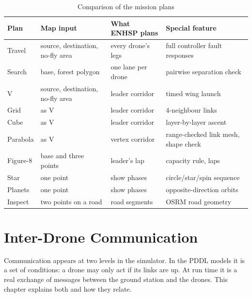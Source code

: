 \documentclass[11pt,a4paper,oneside]{report}
\begin{document}
\begin{table}[!htb]
\caption{Comparison of the mission plans}\label{tab:plansummary}
\small
\begin{tabularx}{\textwidth}{@{}lP{0.2\textwidth}P{0.22\textwidth}Y@{}}
\toprule
\textbf{Plan} & \textbf{Map input} & \textbf{What ENHSP plans} & \textbf{Special feature} \\
\midrule
Travel     & source, destination, no-fly area & every drone's legs & full controller fault responses \\
Search     & base, forest polygon & one lane per drone & pairwise separation check \\
V          & source, destination, no-fly area & leader corridor & timed wing launch \\
Grid       & as V & leader corridor & 4-neighbour links \\
Cube       & as V & leader corridor & layer-by-layer ascent \\
Parabola   & as V & vertex corridor & range-checked link mesh, shape check \\
Figure-8   & base and three points & leader's lap & capacity rule, laps \\
Star       & one point & show phases & circle/star/spin sequence \\
Planets    & one point & show phases & opposite-direction orbits \\
Inspect    & two points on a road & road segments & OSRM road geometry \\
\bottomrule
\end{tabularx}
\end{table}

\chapter{Inter-Drone Communication}\label{ch:comm}
Communication appears at two levels in the simulator. In the PDDL models it is a set of
conditions: a drone may only act if its links are up. At run time it is a real exchange of
messages between the ground station and the drones. This chapter explains both and how they
relate.
\end{document}
